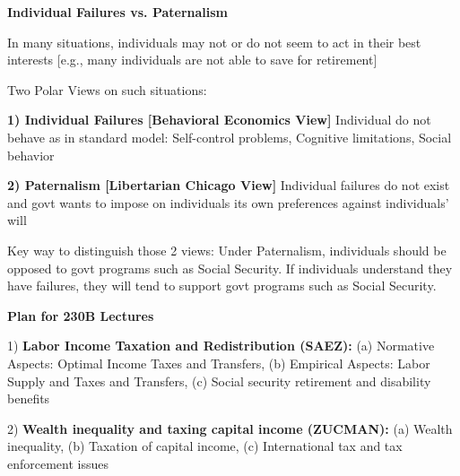 \documentclass[landscape]{slides}
\begin{document}
\begin{slide}
\begin{center}
{\bf Individual Failures vs. Paternalism}
\end{center}

In many situations, individuals may not or do not seem to act in
their best interests [e.g., many individuals are not able to save
for retirement]

Two Polar Views on such situations:

{\bf 1)  Individual Failures [Behavioral Economics View]}
Individual do not behave as in standard model: Self-control problems, Cognitive
limitations, Social behavior

{\bf 2) Paternalism [Libertarian Chicago View]} Individual
failures do not exist and govt wants to impose on individuals its
own preferences against individuals' will


Key way to distinguish those 2 views: Under Paternalism,
individuals should be opposed to govt programs such as Social
Security. If individuals understand they have failures, they will
tend to support govt programs such as Social Security.

\end{slide}




\begin{slide}
\begin{center}
{\bf Plan for 230B Lectures}
\end{center}
1) {\bf Labor Income Taxation and Redistribution (SAEZ):} (a) Normative Aspects: Optimal Income Taxes and Transfers,
(b) Empirical Aspects: Labor Supply and Taxes and Transfers, (c) Social security retirement and disability benefits

2)  {\bf Wealth inequality and taxing capital income (ZUCMAN):} (a) Wealth inequality, (b) Taxation of capital income, (c) International tax and tax enforcement issues





\end{slide}
\end{document}
